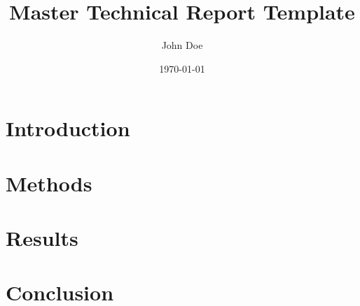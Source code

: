 \documentclass[a4paper,12pt]{report}
\title{Master Technical Report Template}
\author{John Doe}
\date{\today}
\begin{document}
\maketitle
\tableofcontents
\listoffigures
\listoftables
\printglossaries

\chapter{Introduction}


\chapter{Methods}


\chapter{Results}


\chapter{Conclusion}


\printbibliography
\end{document}
